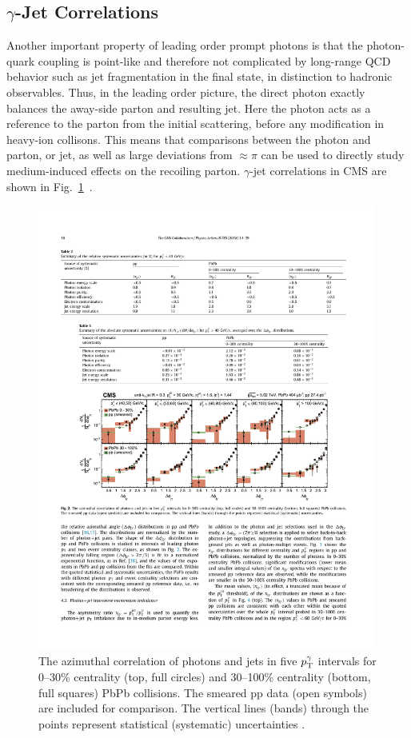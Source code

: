\subsection{$\gamma$-Jet Correlations}
\label{sec:intro_gj}
Another important property of leading order prompt photons is that the photon-quark coupling is point-like and therefore not complicated by long-range QCD behavior such as jet fragmentation in the final state, in distinction to hadronic observables. Thus, in the leading order picture, the direct photon exactly balances the away-side parton and resulting jet. Here the photon acts as a reference to the parton from the initial scattering, before any modification in heavy-ion collisons. This means that comparisons between the photon and parton, or jet, as well as large deviations from \deltaphi $\approx\pi$ can be used to directly study medium-induced effects on the recoiling parton. $\gamma$-jet correlations in CMS are shown in Fig.~\ref{fig:cms_gj_correlations}~\cite{Sirunyan2018}.


\begin{figure}[htpb]
  \centering
  \includegraphics[width=0.99\textwidth]{Introduction/cms_gj_correlations.pdf}
  \caption{The azimuthal correlation of photons and jets in five $p_{\mathrm{T}}^\gamma$ intervals for 0–30\% centrality (top, full circles) and 30–100\% centrality (bottom, full squares) PbPb collisions. The smeared pp data (open symbols) are included for comparison. The vertical lines (bands) through the points represent statistical (systematic) uncertainties \cite{Sirunyan2018}.}
  \label{fig:cms_gj_correlations}
\end{figure}


